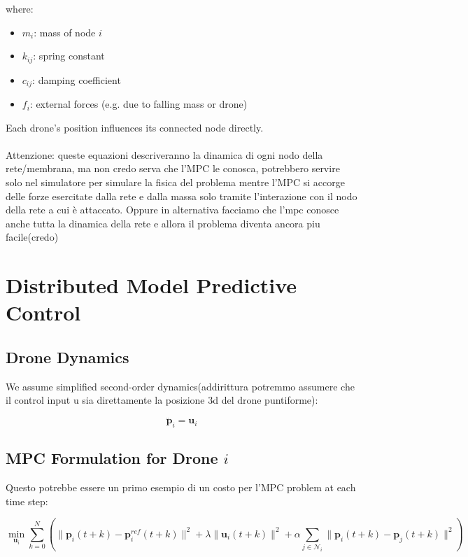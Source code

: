 \documentclass[11pt]{article}
\begin{document}
where:
\begin{itemize}
    \item $m_i$: mass of node $i$
    \item $k_{ij}$: spring constant
    \item $c_{ij}$: damping coefficient
    \item $f_i$: external forces (e.g. due to falling mass or drone)
\end{itemize}

Each drone's position influences its connected node directly. 
\paragraph{}
Attenzione: queste equazioni descriveranno la dinamica di ogni nodo della rete/membrana, ma non credo serva che l'MPC le conosca, potrebbero servire solo nel simulatore per simulare la fisica del problema mentre l'MPC si accorge delle forze esercitate dalla rete e dalla massa solo tramite l'interazione con il nodo della rete a cui è attaccato. Oppure in alternativa facciamo che l'mpc conosce anche tutta la dinamica della rete e allora il problema diventa ancora piu facile(credo)

\section{Distributed Model Predictive Control}

\subsection*{Drone Dynamics}

We assume simplified second-order dynamics(addirittura potremmo assumere che il control input u sia direttamente la posizione 3d del drone puntiforme):

\begin{equation}
\ddot{\mathbf{p}}_i = \mathbf{u}_i
\end{equation}

\subsection*{MPC Formulation for Drone $i$}

Questo potrebbe essere un primo esempio di un costo per l'MPC problem at each time step:

\begin{equation}
\min_{\mathbf{u}_i} \sum_{k=0}^{N} \left( 
\|\mathbf{p}_i(t+k) - \mathbf{p}_i^{ref}(t+k)\|^2 + 
\lambda \|\mathbf{u}_i(t+k)\|^2 +
\alpha \sum_{j \in \mathcal{N}_i} \|\mathbf{p}_i(t+k) - \mathbf{p}_j(t+k)\|^2
\right)
\end{equation}
\end{document}
